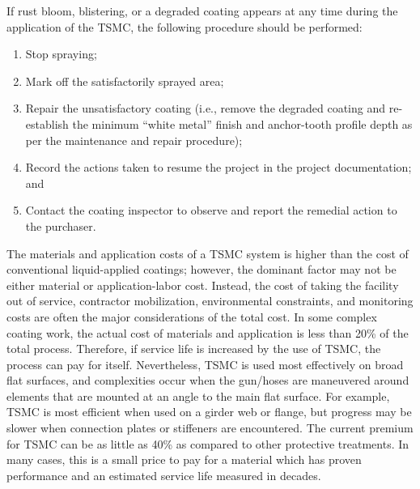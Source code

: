 If rust bloom, blistering, or a degraded coating appears at any time during the application of the TSMC, the
following procedure should be performed:

\begin{enumerate}
  \item Stop spraying;
  \item Mark off the satisfactorily sprayed area;
  \item Repair the unsatisfactory coating (i.e., remove the degraded coating and re-establish the minimum
  “white metal” finish and anchor-tooth profile depth as per the maintenance and repair procedure);
  \item Record the actions taken to resume the project in the project documentation; and
  \item Contact the coating inspector to observe and report the remedial action to the purchaser.
\end{enumerate}

The materials and application costs of a TSMC system is higher than the cost of conventional liquid-applied
coatings; however, the dominant factor may not be either material or application-labor cost. Instead, the cost of
taking the facility out of service, contractor mobilization, environmental constraints, and monitoring costs are often
the major considerations of the total cost. In some complex coating work, the actual cost of materials and application
is less than 20\% of the total process. Therefore, if service life is increased by the use of TSMC, the process can pay
for itself. Nevertheless, TSMC is used most effectively on broad flat surfaces, and complexities occur when the
gun/hoses are maneuvered around elements that are mounted at an angle to the main flat surface. For example,
TSMC is most efficient when used on a girder web or flange, but progress may be slower when connection plates or
stiffeners are encountered. The current premium for TSMC can be as little as 40\% as compared to other protective treatments. In many cases, this is a small price to pay for a material which has proven performance and an estimated
service life measured in decades.

